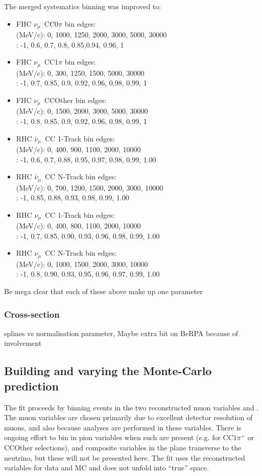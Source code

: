 The merged systematics binning was improved to:
\begin{itemize}
	\item FHC $\nu_{\mu}$~CC0$\pi$ bin edges: \\
	\pmu (MeV/c): 0, 1000, 1250, 2000, 3000, 5000, 30000 \\
	\cosmu:  -1, 0.6, 0.7, 0.8, 0.85,0.94, 0.96, 1
	\item FHC $\nu_{\mu}$~CC1$\pi$  bin edges: \\
	\pmu (MeV/c):  0, 300, 1250, 1500, 5000, 30000 \\
	\cosmu: -1, 0.7, 0.85, 0.9, 0.92, 0.96, 0.98, 0.99, 1
	\item FHC $\nu_{\mu}$~CCOther bin edges: \\
	\pmu (MeV/c): 0, 1500, 2000, 3000, 5000, 30000 \\
	\cosmu:  -1, 0.8, 0.85, 0.9, 0.92, 0.96, 0.98, 0.99, 1
	\item RHC $\bar{\nu}_{\mu}$~CC 1-Track bin edges: \\
	\pmu (MeV/c): 0, 400, 900, 1100, 2000, 10000 \\
	\cosmu:  -1, 0.6, 0.7, 0.88, 0.95, 0.97, 0.98, 0.99, 1.00
	\item RHC $\bar{\nu}_{\mu}$~CC N-Track bin edges: \\
	\pmu (MeV/c):  0, 700, 1200, 1500, 2000, 3000, 10000 \\
	\cosmu: -1, 0.85, 0.88, 0.93, 0.98, 0.99, 1.00
	\item RHC $\nu_{\mu}$~CC 1-Track bin edges: \\
	\pmu (MeV/c):  0, 400, 800, 1100, 2000, 10000 \\
	\cosmu:   -1, 0.7, 0.85, 0.90, 0.93, 0.96, 0.98, 0.99, 1.00
	\item RHC $\nu_{\mu}$~CC N-Track bin edges: \\
	\pmu (MeV/c):  0, 1000, 1500, 2000, 3000, 10000 \\
	\cosmu: -1, 0.8, 0.90, 0.93, 0.95, 0.96, 0.97, 0.99, 1.00
\end{itemize}
Be mega clear that each of these above make up one parameter

\subsubsection{Cross-section}
\label{subsec:ND280:syst:xsec}
splines vs normalisation parameter, Maybe extra bit on BeRPA because of involvement

\subsection{Building and varying the Monte-Carlo prediction}
The fit proceeds by binning events in the two reconstructed muon variables \pmu and \cosmu. The muon variables are chosen primarily due to excellent detector resolution of muons, and also because \sk analyses are performed in these variables. There is ongoing effort to bin in pion variables when such are present (e.g. for CC$1\pi^+$ or CCOther selections), and composite variables in the plane transverse to the neutrino, but these will not be presented here. The fit uses the reconstructed variables for data and MC and does not unfold into ``true'' space.

